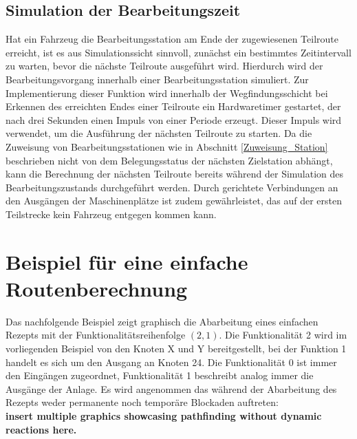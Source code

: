 		\subsection{Simulation der Bearbeitungszeit}
			\label{Simulation Station}
			Hat ein Fahrzeug die Bearbeitungsstation am Ende der zugewiesenen Teilroute erreicht, ist es aus Simulationssicht sinnvoll, zunächst ein bestimmtes Zeitintervall zu warten, bevor die nächste Teilroute ausgeführt wird. Hierdurch wird der Bearbeitungsvorgang innerhalb einer Bearbeitungsstation simuliert. Zur Implementierung dieser Funktion wird innerhalb der Wegfindungsschicht bei Erkennen des erreichten Endes einer Teilroute ein Hardwaretimer gestartet, der nach drei Sekunden einen Impuls von einer Periode erzeugt. Dieser Impuls wird verwendet, um die Ausführung der nächsten Teilroute zu starten. Da die Zuweisung von Bearbeitungsstationen wie in Abschnitt \ref{Zuweisung_Station} beschrieben nicht von dem Belegungsstatus der nächsten Zielstation abhängt, kann die Berechnung der nächsten Teilroute bereits während der Simulation des Bearbeitungszustands durchgeführt werden. Durch gerichtete Verbindungen an den Ausgängen der Maschinenplätze ist zudem gewährleistet, das auf der ersten Teilstrecke kein Fahrzeug entgegen kommen kann.
	
		
	\section{Beispiel für eine einfache Routenberechnung}
	
		Das nachfolgende Beispiel zeigt graphisch die Abarbeitung eines einfachen Rezepts mit der Funktionalitätsreihenfolge $(2,1)$. Die Funktionalität 2 wird im vorliegenden Beispiel von den Knoten X und Y bereitgestellt, bei der Funktion 1 handelt es sich um den Ausgang an Knoten 24. Die Funktionalität 0 ist immer den Eingängen zugeordnet, Funktionalität 1 beschreibt analog immer die Ausgänge der Anlage. Es wird angenommen das während der Abarbeitung des Rezepts weder permanente noch temporäre Blockaden auftreten:\\
		\textbf{insert multiple graphics showcasing pathfinding without dynamic reactions here.}